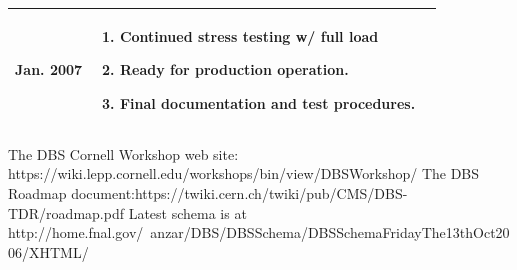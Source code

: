 \documentclass{cmspaper}
\begin{document}
\begin{table}[htb]
\begin{center}
\begin{tabular}{|l|p{3.5in}|p{1.5in}|}
Jan. 2007  & 
\begin{enumerate} 
 \item Continued stress testing w/ full load
\item Ready for production operation.
 \item Final documentation and test procedures.
 \end{enumerate}   &  \\ \hline
      \end{tabular}
    \end{center}
  \end{table}  



\begin{thebibliography}{9}
   {The DBS Cornell Workshop web site: https://wiki.lepp.cornell.edu/workshops/bin/view/DBSWorkshop/}
   {The DBS Roadmap document:https://twiki.cern.ch/twiki/pub/CMS/DBS-TDR/roadmap.pdf}
   {Latest schema is at http://home.fnal.gov/~anzar/DBS/DBSSchema/DBSSchemaFridayThe13thOct2006/XHTML/}

\end{thebibliography}
\end{document}
